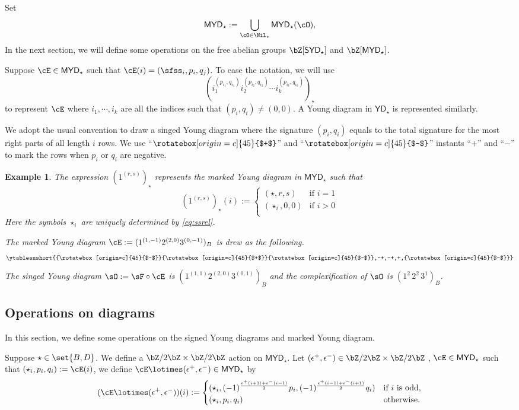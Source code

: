 \documentclass[12pt,a4paper]{amsart}
\def\YD{{\mathsf{YD}}}
\def\SYD{{\mathsf{SYD}}}
\def\MYD{{\mathsf{MYD}}}
\numberwithin{equation}{section}
\newtheorem{eg}[thm]{Example}
\theoremstyle{remark}
\let\ytb=\ytableaushort
\def\upp{{\rotatebox[origin=c]{45}{$+$}}}
\def\umm{{\rotatebox[origin=c]{45}{$-$}}}
\begin{document}
Set
\[
  \MYD_{\star} := \bigcup_{\cO\in \Nil_{\star}}\MYD_{\star}(\cO),
\]
In the next section, we will define some operations on the  free abelian groups
$\bZ[\SYD_{\star}]$ and $\bZ[\MYD_{\star}]$.

\smallskip

Suppose $\cE\in \MYD_{\star}$ such that $\cE(i)=(\sfss_{i},p_{i},q_{j})$.
To ease the notation, we will use
\[
  ( i_{1}^{(p_{i_{1}},q_{i_{1}})}i_{2}^{(p_{i_{2}},q_{i_{2}})}\cdots i_{k}^{(p_{i_{k}},q_{i_{k}})} )_{\star}
\]
to represent $\cE$ where
$i_{1},\cdots, i_{k}$ are all the indices such that $(p_{i},q_{i})\neq (0,0)$.
A Young diagram in $\YD_{\star}$ is represented similarly.

We adopt the usual convention to draw a singed Young diagram where the signature
$(p_{i}, q_{i})$ equals to the total signature for the most right parts of all
length $i$ rows.
We use ``$\upp$'' and ``$\umm$'' instants ``$+$'' and ``$-$'' to mark the rows
when $p_{i}$ or $q_{i}$ are negative.

\begin{eg}\label{eg:MYD}
The expression $(1^{(r,s)})_{\star}$ represents the marked Young diagram in $\MYD_{\star}$ such that
 \[
   (1^{(r,s)})_{\star}(i) := \begin{cases}
     (\star,r,s) & \text{if } i=1\\
     (\star_{i},0,0) & \text{if $i>0$}\\
   \end{cases}
 \]
 Here the symbols $\star_{i}$ are uniquely determined by \eqref{eq:ssrel}.

The marked Young diagram  $\cE:=(1^{(1,-1)}2^{(2,0)}3^{(0,-1)})_{B}$ is drew as the
following.
\[
  \ytb{\umm\upp\umm,-+,-+,+,\umm}
\]
The singed Young diagram $\sO:=\sF\circ \cE$ is
$(1^{(1,1)}2^{(2,0)}3^{(0,1)})_{B}$ and the complexification of $\sO$
is $(1^{2}\,2^{2}\,3^{1})_{B}$.
\end{eg}

\subsection{Operations on diagrams}
In this section, we define some operations on the signed Young diagrams and
marked Young diagram.

Suppose $\star\in \set{B,D}$.
We define a $\bZ/2\bZ\times \bZ/2\bZ$ action on $\MYD_{\star}$.
Let $(\epsilon^{+},\epsilon^{-})\in \bZ/2\bZ\times \bZ/2\bZ$ , $\cE\in \MYD_{\star}$ such that $(\star_{i},p_{i},q_{i}):=\cE(i)$,
we define $\cE \lotimes (\epsilon^{+},\epsilon^{-})\in \MYD_{\star}$ by
\[
(\cE \lotimes(\epsilon^{+},\epsilon^{-}))(i) := \begin{cases}
  (\star_{i}, (-1)^{\frac{\epsilon^{+}(i+1)+\epsilon^{-}(i-1)}{2}}p_{i},(-1)^{\frac{\epsilon^{+}(i-1)+\epsilon^{-}(i+1)}{2}}q_{i})
  & \text{if $i$  is odd,}\\
  (\star_{i}, p_{i},q_{i}) & \text{otherwise.}
\end{cases}
\]
\end{document}
